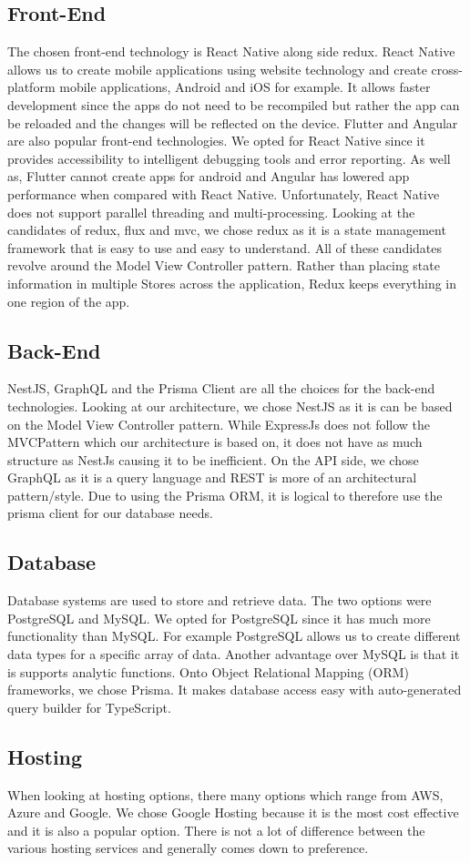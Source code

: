 \documentclass[hidelinks, 12pt, a4paper]{article}
\begin{document}
\subsection{Front-End}
The chosen front-end technology is React Native along side redux.
React Native allows us to create mobile applications using website technology and create cross-platform mobile applications, Android and iOS for example.
It allows faster development since the apps do not need to be recompiled but rather the app can be reloaded and the changes will be reflected on the device.
Flutter and Angular are also popular front-end technologies.
We opted for React Native since it provides accessibility to intelligent debugging tools and error reporting.
As well as, Flutter cannot create apps for android and Angular has lowered app performance when compared with React Native.
Unfortunately, React Native does not support parallel threading and multi-processing.
\newline
\newline
Looking at the candidates of redux, flux and mvc, we chose redux as it is a state management framework that is easy to use and easy to understand.
All of these candidates revolve around the Model View Controller pattern.
Rather than placing state information in multiple Stores across the application, Redux keeps everything in one region of the app.
\subsection{Back-End}
NestJS, GraphQL and the Prisma Client are all the choices for the back-end technologies.
Looking at our architecture, we chose NestJS as it is can be based on the Model View Controller pattern.
While ExpressJs does not follow the MVCPattern which our architecture is based on, it does not have as much structure as NestJs causing it to be inefficient.
On the API side, we chose GraphQL as it is a query language and REST is more of an architectural pattern/style.
Due to using the Prisma ORM, it is logical to therefore use the prisma client for our database needs.
\subsection{Database}
Database systems are used to store and retrieve data.
The two options were PostgreSQL and MySQL.
We opted for PostgreSQL since it has much more functionality than MySQL.
For example PostgreSQL allows us to create different data types for a specific array of data.
Another advantage over MySQL is that it is supports analytic functions.
\newline
\newline
Onto Object Relational Mapping (ORM) frameworks, we chose Prisma.
It makes database access easy with auto-generated query builder for TypeScript.
\subsection{Hosting}
When looking at hosting options, there many options which range from AWS, Azure and Google.
We chose Google Hosting because it is the most cost effective and it is also a popular option.
There is not a lot of difference between the various hosting services and generally comes down to preference.
\newpage
\end{document}
